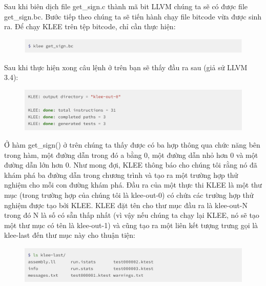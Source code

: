 \documentclass[12pt,a4paper]{article}
\begin{document}
Sau khi biên dịch file get\_sign.c thành mã bit LLVM chúng ta sẽ có được file get\_sign.bc. Bước tiếp theo chúng ta sẽ tiến hành chạy file bitcode vừa được sinh ra. Để chạy KLEE trên tệp bitcode, chỉ cần thực hiện:

\begin{figure}[ht]
\begin{center}
\includegraphics[scale=.3]{hinhanh/runningklee.png}
\end{center}
\end{figure}

Sau khi thực hiện xong câu lệnh ở trên bạn sẽ thấy đầu ra sau (giả sử LLVM 3.4):

\begin{figure}[ht]
\begin{center}
\includegraphics[scale=.3]{hinhanh/outputklee.png}
\end{center}
\end{figure}

Ở hàm get\_sign() ở trên chúng ta thấy được có  ba  hợp thông qua chức năng bên trong hàm, một đường dẫn trong đó a bằng 0, một đường dẫn nhỏ hơn 0 và một đường dẫn lớn hơn 0. Như mong đợi, KLEE thông báo cho chúng tôi rằng nó đã khám phá ba đường dẫn trong chương trình và tạo ra một trường hợp thử nghiệm cho mỗi con đường khám phá. Đầu ra của một thực thi KLEE là một thư mục (trong trường hợp của chúng tôi là klee-out-0) có chứa các trường hợp thử nghiệm được tạo bởi KLEE. KLEE đặt tên cho thư mục đầu ra là klee-out-N trong đó N là số có sẵn thấp nhất (vì vậy nếu chúng ta chạy lại KLEE, nó sẽ tạo một thư mục có tên là klee-out-1) và cũng tạo ra một liên kết tượng trưng gọi là klee-last đến thư mục này cho thuận tiện:

\begin{figure}[ht]
\begin{center}
\includegraphics[scale=.3]{hinhanh/outputfolder.png}
\end{center}
\end{figure}
\end{document}
